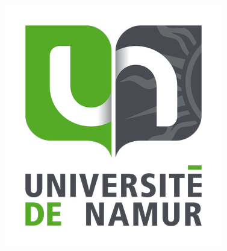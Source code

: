 \documentclass[a4paper,12pt,titlepage]{scrartcl}
\begin{document}
\begin{center}
\includegraphics[scale=0.23]{unamur.png}
\end{center}
\end{document}
